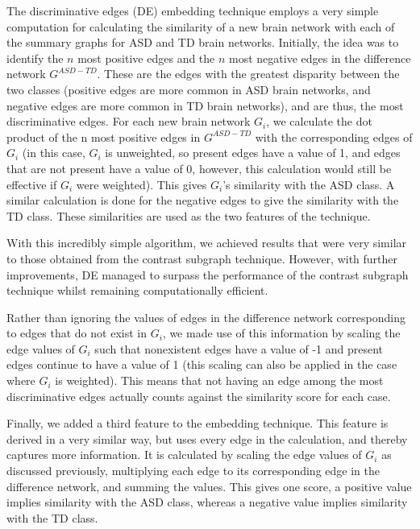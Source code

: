 \documentclass[letterpaper]{article}
\begin{document}
The discriminative edges (DE) embedding technique employs a very simple computation for calculating the similarity of a new brain network with each of the summary graphs for ASD and TD brain networks.
Initially, the idea was to identify the $n$ most positive edges and the $n$ most negative edges in the difference network $G^{ASD - TD}$.
These are the edges with the greatest disparity between the two classes (positive edges are more common in ASD brain networks, and negative edges are more common in TD brain networks), and are thus, the most discriminative edges.
For each new brain network $G_i$, we calculate the dot product of the n most positive edges in $G^{ASD - TD}$ with the corresponding edges of $G_i$ (in this case, $G_i$ is unweighted, so present edges have a value of 1, and edges that are not present have a value of 0, however, this calculation would still be effective if $G_i$ were weighted).
This gives $G_i$'s similarity with the ASD class.
A similar calculation is done for the negative edges to give the similarity with the TD class.
These similarities are used as the two features of the technique.

With this incredibly simple algorithm, we achieved results that were very similar to those obtained from the contrast subgraph technique.
However, with further improvements, DE managed to surpass the performance of the contrast subgraph technique whilst remaining computationally efficient.

Rather than ignoring the values of edges in the difference network corresponding to edges that do not exist in $G_i$, we made use of this information by scaling the edge values of $G_i$ such that nonexistent edges have a value of -1 and present edges continue to have a value of 1 (this scaling can also be applied in the case where $G_i$ is weighted).
This means that not having an edge among the most discriminative edges actually counts against the similarity score for each case.

Finally, we added a third feature to the embedding technique.
This feature is derived in a very similar way, but uses every edge in the calculation, and thereby captures more information.
It is calculated by scaling the edge values of $G_i$ as discussed previously, multiplying each edge to its corresponding edge in the difference network, and summing the values.
This gives one score, a positive value implies similarity with the ASD class, whereas a negative value implies similarity with the TD class.
\end{document}

